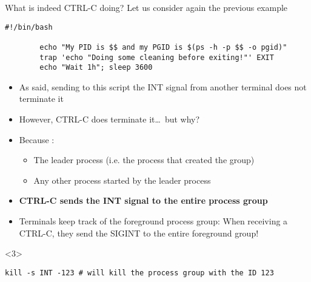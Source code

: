 \begin{frame}[fragile]{What is indeed CTRL-C doing?}
    \vspace{-3mm}
    Let us consider again the previous example
    \begin{lstlisting}[style=MyBash, numbers=none, aboveskip=2mm]
        #!/bin/bash

        echo "My PID is $$ and my PGID is $(ps -h -p $$ -o pgid)"
        trap 'echo "Doing some cleaning before exiting!"' EXIT
        echo "Wait 1h"; sleep 3600
    \end{lstlisting}
    \begin{overlayarea}{\textwidth}{0.5\textheight}
        \begin{itemize}
            \item<1-> As said, sending to this script the INT signal from another terminal does not terminate it
            \item<1-> However, CTRL-C does terminate it\ldots\ but why?
            \item<2-> Because :
                      \begin{itemize}
                          \item The leader process (i.e. the process that created the group)
                          \item Any other process started by the leader process
                      \end{itemize}
            \item<2-> \alert{\textbf{CTRL-C sends the INT signal to the entire process group}}
            \item<2-> Terminals keep track of the foreground process group: When receiving a CTRL-C, they send the SIGINT to the entire foreground group!
        \end{itemize}
        \begin{onlyenv}<3>
            \begin{lstlisting}[style=MyBash, numbers=none, xleftmargin=2mm, xrightmargin=2mm]
                kill -s INT -123 # will kill the process group with the ID 123
            \end{lstlisting}
        \end{onlyenv}
    \end{overlayarea}
\end{frame}
